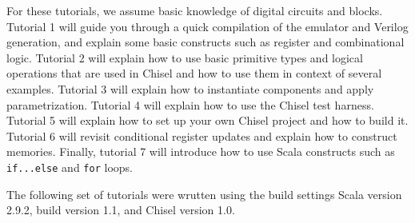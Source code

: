 For these tutorials, we assume basic knowledge of digital circuits and blocks. 
Tutorial 1 will guide you through a quick compilation of the emulator and Verilog generation, and explain some basic constructs such as register and combinational logic. 
Tutorial 2 will explain how to use basic primitive types and logical operations that are used in Chisel and how to use them in context of several examples. 
Tutorial 3 will explain how to instantiate components and apply parametrization. 
Tutorial 4 will explain how to use the Chisel test harness. 
Tutorial 5 will explain how to set up your own Chisel project and how to build it.
Tutorial 6 will revisit conditional register updates and explain how to construct memories.
Finally, tutorial 7 will introduce how to use Scala constructs such as \verb+if...else+ and \verb+for+ loops.

The following set of tutorials were wrutten using the build settings Scala version 2.9.2, build version 1.1, and Chisel version 1.0.
